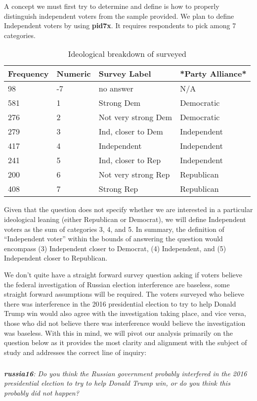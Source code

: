 \documentclass[12pt]{article}
\begin{document}
A concept we must first try to determine and define is how to properly distinguish independent voters from the sample provided. We plan to define Independent voters by using \textbf{pid7x}. It requires respondents to pick among 7 categories.

\begin{table}[H]
    \centering
    \begin{tabular}{|l|l|l|l|}
    \hline
        Frequency & Numeric & Survey Label & *Party Alliance* \\ \hline
        98 & -7 & no answer & N/A  \\ \hline
        581 & 1 & Strong Dem & Democratic  \\ \hline
        276 & 2 & Not very strong Dem & Democratic  \\ \hline
        279 & 3 & Ind, closer to Dem & Independent  \\ \hline
        417 & 4 & Independent & Independent  \\ \hline
        241 & 5 & Ind, closer to Rep & Independent  \\ \hline
        200 & 6 & Not very strong Rep & Republican  \\ \hline
        408 & 7 & Strong Rep & Republican  \\ \hline
    \end{tabular}
\caption{Ideological breakdown of surveyed}
\end{table}


Given that the question does not specify whether we are interested in a particular ideological leaning (either Republican or Democrat), we will define Independent voters as the sum of categories 3, 4, and 5. In summary, the definition of “Independent voter” within the bounds of answering the question would encompass (3) Independent closer to Democrat, (4) Independent, and (5) Independent closer to Republican.

We don't quite have a straight forward survey question asking if voters believe the federal investigation of Russian election interference are baseless, some straight forward assumptions will be required. The voters surveyed who believe there was interference in the 2016 presidential election to try to help Donald Trump win would also agree with the investigation taking place, and vice versa, those who did not believe there was interference would believe the investigation was baseless. With this in mind, we will pivot our analysis primarily on the question below as it provides the most clarity and alignment with the subject of study and addresses the correct line of inquiry:
\subparagraph{}
\emph{\textbf{russia16}:  Do you think the Russian government probably interfered in the 2016 presidential election to try to help Donald Trump win, or do you think this probably did not happen?}
\end{document}
